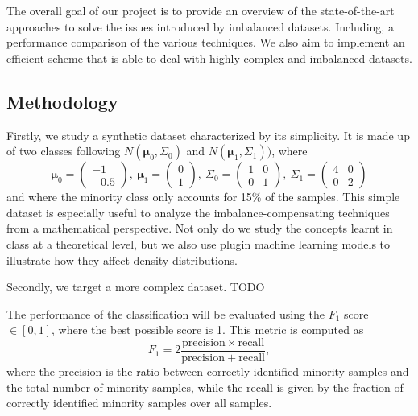 \documentclass[conference]{IEEEtran}
\begin{document}
	The overall goal of our project is to provide an overview of the state-of-the-art approaches to solve the issues introduced by imbalanced datasets. Including, a performance comparison of the various techniques. We also aim to implement an efficient scheme that is able to deal with highly complex and imbalanced datasets.


	\subsection{Methodology}
	Firstly, we study a synthetic dataset characterized by its simplicity. It is made up of two classes following $N(\boldsymbol\mu_0, \Sigma_0)$ and $N(\boldsymbol\mu_1, \Sigma_1))$, where
			\begin{equation*}
				\boldsymbol\mu_0=
				\begin{pmatrix}
					-1\\
					-0.5
				\end{pmatrix},\ %
				\boldsymbol\mu_1=
				\begin{pmatrix}
					0\\
					1
				\end{pmatrix},\ %
				\Sigma_0=
				\begin{pmatrix}
					1 & 0\\
					0 & 1
				\end{pmatrix},\ %
				\Sigma_1=
				\begin{pmatrix}
					4 & 0\\
					0 & 2
				\end{pmatrix}
			\end{equation*} and where the minority class only accounts for 15\% of the samples. This simple dataset is especially useful to analyze the imbalance-compensating techniques from a mathematical perspective. Not only do we study the concepts learnt in class at a theoretical level, but we also use plugin machine learning models to illustrate how they affect density distributions.

		Secondly, we target a more complex dataset.  TODO

		The performance of the classification will be evaluated using the $F_1$ score $\in [0, 1]$, where the best possible score is 1. This metric is computed as
			\begin{equation*}
				F_1 = 2\frac{\mathrm{precision}\times\mathrm{recall}}{\mathrm{precision}+\mathrm{recall}},
			\end{equation*}
where the precision is the ratio between correctly identified minority samples and the total number of minority samples, while the recall is given by the fraction of correctly identified minority samples over all samples.
\end{document}

